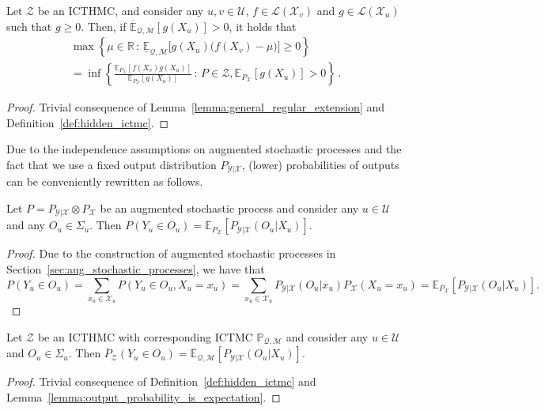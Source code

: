 \documentclass[twoside,11pt]{article}
\newcommand{\reals}{\mathbb{R}}
\newcommand{\states}{\mathcal{X}}
\newcommand{\observs}{\mathcal{Y}}
\newcommand{\lexp}{\underline{\mathbb{E}}_{\rateset,\mathcal{M}}}
\newcommand{\uexp}{\overline{\mathbb{E}}_{\rateset,\mathcal{M}}}
\newcommand{\gambles}{\mathcal{L}}
\newcommand{\rateset}{\mathcal{Q}}
\begin{document}
\begin{corollary}\label{cor:lower_hidden_is_root_chain}
Let $\mathcal{Z}$ be an ICTHMC, and consider any $u,v\in\mathcal{U}$, $f\in\gambles(\states_v)$ and $g\in\gambles(\states_u)$ such that $g\geq 0$. Then, if $\uexp[g(X_u)]>0$, it holds that
\begin{multline*}
\max\left\{\mu\in\reals\,:\, \lexp\bigl[g(X_u)\bigl(f(X_v) - \mu\bigr)\bigr] \geq 0\right\}\\ = \inf\left\{ \frac{\mathbb{E}_{P_\states}[f(X_v)g(X_u)]}{\mathbb{E}_{P_\states}[g(X_u)]}\,:\,P\in\mathcal{Z}, \mathbb{E}_{P_\states}[g(X_u)]>0 \right\}\,.
\end{multline*}
\end{corollary}
\begin{proof}
Trivial consequence of Lemma~\ref{lemma:general_regular_extension} and Definition~\ref{def:hidden_ictmc}.
\end{proof}

Due to the independence assumptions on augmented stochastic processes and the fact that we use a fixed output distribution $P_{\observs\vert\states}$, (lower) probabilities of outputs can be conveniently rewritten as follows.
\begin{lemma}\label{lemma:output_probability_is_expectation}
Let $P=P_{\observs\vert\states}\otimes P_\states$ be an augmented stochastic process and consider any $u\in\mathcal{U}$ and any $O_u\in\Sigma_u$. Then $P(Y_u\in O_u)=\mathbb{E}_{P_\states}[P_{\observs\vert\states}(O_u\vert X_u)]$.
\end{lemma}
\begin{proof}
Due to the construction of augmented stochastic processes in Section~\ref{sec:aug_stochastic_processes}, we have that
\begin{equation*}
P(Y_u\in O_u) = \sum_{x_u\in\states_u} P(Y_u\in O_u, X_u=x_u) 
 = \sum_{x_u\in\states_u} P_{\observs\vert\states}(O_u\vert x_u)P_\states(X_u=x_u) 
 = \mathbb{E}_{P_\states}[P_{\observs\vert\states}(O_u\vert X_u)].
\end{equation*}
\end{proof}
\begin{lemma}\label{lemma:lower_output_probability_is_expectation}
Let $\mathcal{Z}$ be an ICTHMC with corresponding ICTMC $\mathbb{P}_{\rateset,\mathcal{M}}$ and consider any $u\in\mathcal{U}$ and $O_u\in\Sigma_u$. Then $\overline{P}_{\mathcal{Z}}(Y_u\in O_u)=\uexp[P_{\observs\vert\states}(O_u\vert X_u)]$.
\end{lemma}
\begin{proof}
Trivial consequence of Definition~\ref{def:hidden_ictmc} and Lemma~\ref{lemma:output_probability_is_expectation}.
\end{proof}
\end{document}
